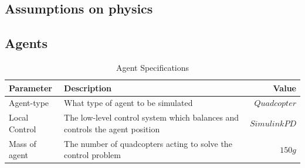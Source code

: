 \subsection{Assumptions on physics}
\label{sec:physics}

\subsection{Agents}
\label{sec:agents}
\begin{table}[]
\centering
\begin{tabularx}{1\textwidth}{l@{}Xr}
\toprule
\textbf{Parameter}   & \textbf{Description}                                                        & \textbf{Value} \\ \midrule
Agent-type       	 & What type of agent to be simulated                                          & ${Quadcopter}$ \\
Local Control        & The low-level control system which balances and controls the agent position & ${Simulink PD}$\\
Mass of agent     	 & The number of quadcopters acting to solve the control problem               & ${150g}$        \\
\bottomrule
\end{tabularx}
\caption{Agent Specifications}
\label{tab:agent_specs}
\end{table}

